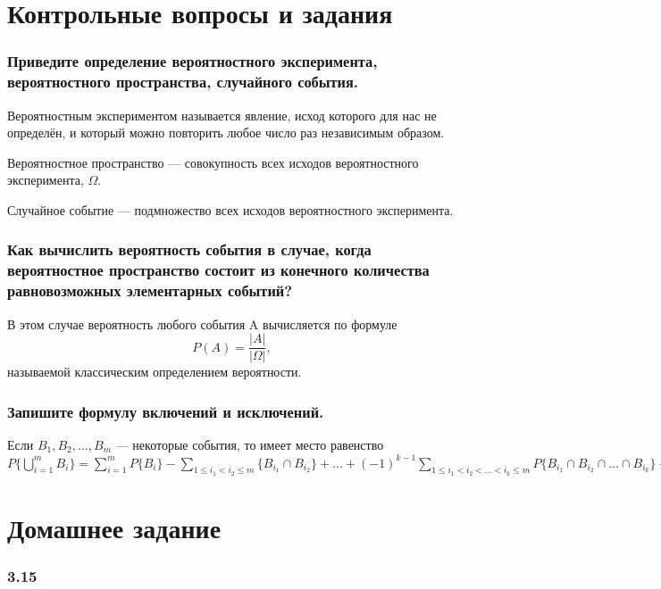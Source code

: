 \documentclass{book}
\begin{document}
\section*{Контрольные вопросы и задания}

\subsubsection*{Приведите определение вероятностного эксперимента, вероятностного пространства, случайного события.}

Вероятностным экспериментом называется явление, исход которого для нас не определён, и который можно повторить любое число раз независимым образом.

Вероятностное пространство --- совокупность всех исходов вероятностного эксперимента, $\Omega$.

Случайное событие --- подмножество всех исходов вероятностного эксперимента.

\subsubsection*{Как вычислить вероятность события в случае, когда вероятностное пространство состоит из конечного количества равновозможных элементарных событий?}

В этом случае вероятность любого события A вычисляется по формуле $$P(A)=\frac{|A|}{|\Omega|},$$ называемой классическим определением вероятности.

\subsubsection*{Запишите формулу включений и исключений.}

Если $B_1, B_2,  \dotsc , B_m$ --- некоторые события, то имеет место равенство $P\{\bigcup\limits_{i=1}^mB_i\}=\sum\limits_{i=1}^mP\{B_i\}-\sum\limits_{1\leq i_1<i_2\leq m}\{B_{i_1}\cap B_{i_2}\}+ \dotsc +(-1)^{k-1}\sum\limits_{1\leq i_1<i_2< \dotsc <i_k\leq m}P\{B_{i_1}\cap B_{i_2}\cap \dotsc \cap B_{i_k}\}+ \dotsc +(-1)^{m-1}P\{B_1\cap B_2\cap \dotsc \cap B_m\}.$

\section*{Домашнее задание}

\subsubsection*{3.15}
\end{document}
